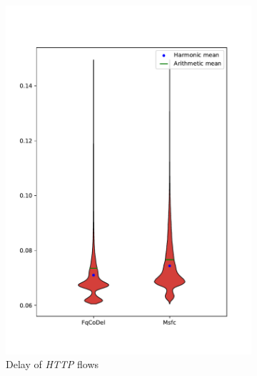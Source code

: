 \begin{figure}
\begin{subfigure}[b]{0.475\textwidth}
		\includegraphics[width=\textwidth]{drawings/type4-delay-down_A}
		\caption[]%
		{{\small Delay of \emph{HTTP} flows}}    
		\label{fig:delay_http}
	\end{subfigure}
	\quad
	\begin{subfigure}[b]{0.475\textwidth}   
		\centering 

\end{subfigure}
\end{figure}
